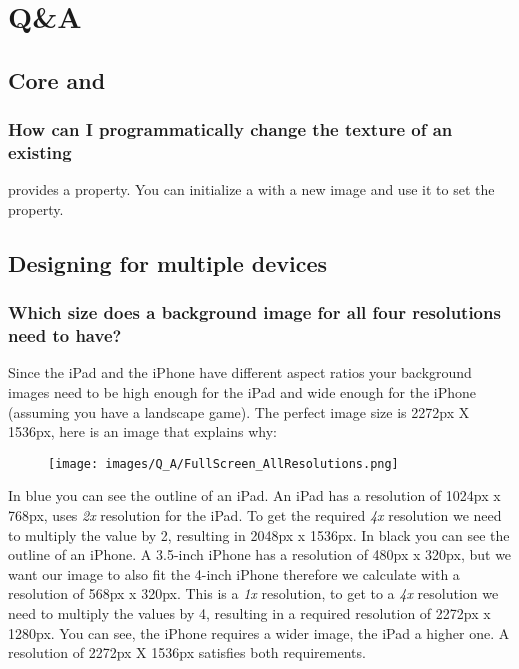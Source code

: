 \chapter{Q\&A}

\section{Core \cocos{} and \SB{}}

\subsection{How can I programmatically change the texture of an existing
\ccsprite{}}
\ccsprite{} provides a  property. You can initialize a
 with a new image and use it to set the
 property.


\section{Designing for multiple devices}

\subsection{Which size does a background image for all four resolutions need to
have?}\label{background_all_resolutions}
Since the iPad and the iPhone have different aspect ratios your
background images need to be high enough for the iPad and wide enough for the
iPhone (assuming you have a landscape game). The perfect image size is 2272px X
1536px, here is an image that explains why:

\begin{figure}[H]
		\centering
		\texttt{[image: images/Q\_A/FullScreen\_AllResolutions.png]}
\end{figure}

In blue you can see the outline of an iPad. An iPad has a resolution of
1024px x 768px, \SB{} uses \textit{2x} resolution for the iPad. To get the
required \textit{4x} resolution we need to multiply the value by 2, resulting in 2048px x 1536px.
In black you can see the outline of an iPhone. A 3.5-inch iPhone has a resolution
of 480px x 320px, but we want our image to also fit the 4-inch iPhone therefore
we calculate with a resolution of 568px x 320px. This is a \textit{1x}
resolution, to get to a \textit{4x} resolution we need to multiply the values by
4, resulting in a required resolution of 2272px x 1280px. You can see, the
iPhone requires a wider image, the iPad a higher one. A resolution of 2272px X
1536px satisfies both requirements. 

